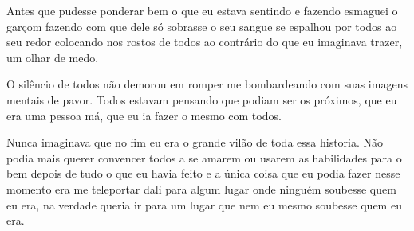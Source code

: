Antes que pudesse ponderar bem o que eu estava sentindo e fazendo esmaguei o garçom fazendo com que dele só sobrasse o seu sangue se espalhou por todos ao seu redor colocando nos rostos de todos ao contrário do que eu imaginava trazer, um olhar de medo.

O silêncio de todos não demorou em romper me bombardeando com suas imagens mentais de pavor. Todos estavam pensando que podiam ser os próximos, que eu era uma pessoa má, que eu ia fazer o mesmo com todos.

Nunca imaginava que no fim eu era o grande vilão de toda essa historia. Não podia mais querer convencer todos a se amarem ou usarem as habilidades para o bem depois de tudo o que eu havia feito e a única coisa que eu podia fazer nesse momento era me teleportar dali para algum lugar onde ninguém soubesse quem eu era, na verdade queria ir para um lugar que nem eu mesmo soubesse quem eu era.